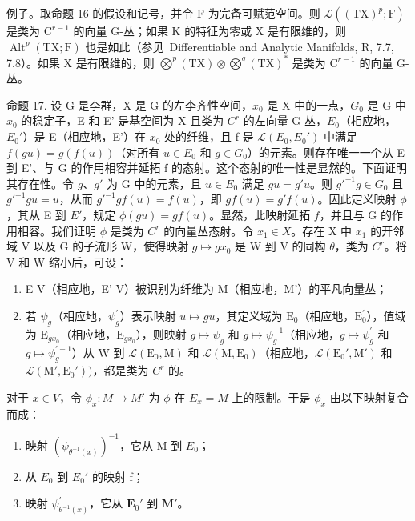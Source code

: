 例子。取命题 16 的假设和记号，并令 F 为完备可赋范空间。则 \(\mathcal{L}((\mathrm{TX})^p; \mathrm{F})\) 是类为 \(\mathrm{C}^{r-1}\) 的向量 G-丛；如果 K 的特征为零或 X 是有限维的，则 \(\operatorname{Alt}^p(\mathrm{TX}; \mathrm{F})\) 也是如此（参见~Differentiable and Analytic Manifolds, R, 7.7, 7.8）。如果 X 是有限维的，则 \(\bigotimes^p(\mathrm{TX}) \otimes \bigotimes^q(\mathrm{TX})^*\) 是类为 \(\mathrm{C}^{r-1}\) 的向量 G-丛。

命题 17. 设 G 是李群，X 是 G 的左李齐性空间，\(x_0\) 是 X 中的一点，\(G_0\) 是 G 中 \(x_0\) 的稳定子，E 和 E' 是基空间为 X 且类为 \(C^{r}\) 的左向量 G-丛，\(E_0\)（相应地，\(E_0'\)）是 E（相应地，E'）在 \(x_0\) 处的纤维，且 f 是 \(\mathcal{L}(E_0, E_0')\) 中满足 \(f(gu) = g(f(u))\)（对所有 \(u \in E_0\) 和 \(g \in G_0\)）的元素。则存在唯一一个从 E 到 E'、与 G 的作用相容并延拓 f 的态射。这个态射的唯一性是显然的。下面证明其存在性。令 \(g\)、\(g'\) 为 G 中的元素，且 \(u \in E_0\) 满足 \(gu = g'u\)。则 \(g'^{-1}g \in G_0\) 且 \(g'^{-1}gu = u\)，从而 \(g'^{-1}gf(u) = f(u)\)，即 \(gf(u) = g'f(u)\)。因此定义映射 \(\phi\)，其从 E 到 \(E'\)，规定 \(\phi(gu) = gf(u)\)。显然，此映射延拓 \(f\)，并且与 G 的作用相容。我们证明 \(\phi\) 是类为 \(C^r\) 的向量丛态射。令 \(x_1 \in X\)。存在 X 中 \(x_1\) 的开邻域 V 以及 G 的子流形 W，使得映射 \(g \mapsto gx_0\) 是 W 到 V 的同构 \(\theta\)，类为 \(C^r\)。将 V 和 W 缩小后，可设：

\begin{enumerate}
\def\labelenumi{(\arabic{enumi})}
\item
  E \textbar{} V（相应地，E' \textbar{} V）被识别为纤维为 M（相应地，M'）的平凡向量丛；
\item
  若 \(\psi_{g}\)（相应地，\(\psi_{g}^{\prime}\)）表示映射 \(u\mapsto gu\)，其定义域为 \(\mathrm{E}_0\)（相应地，\(\mathrm{E}_0^{\prime}\)），值域为 \(\mathrm{E}_{gx_0}\)（相应地，\(\mathrm{E}_{gx_0}\)），则映射 \(g\mapsto \psi_g\) 和 \(g\mapsto \psi_g^{-1}\)（相应地，\(g\mapsto \psi_g^{\prime}\) 和 \(g\mapsto \psi_g^{\prime -1}\)）从 W 到 \(\mathcal{L}(\mathrm{E}_0,\mathrm{M})\) 和 \(\mathcal{L}(\mathrm{M},\mathrm{E}_0)\)（相应地，\(\mathcal{L}(\mathrm{E}_0',\mathrm{M}')\) 和 \(\mathcal{L}(\mathrm{M}',\mathrm{E}_0'))\)，都是类为 \(C^r\) 的。
\end{enumerate}

对于 \(x \in V\)，令 \(\phi_x: M \to M'\) 为 \(\phi\) 在 \(E_x = M\) 上的限制。于是 \(\phi_x\) 由以下映射复合而成：

\begin{enumerate}
\def\labelenumi{(\arabic{enumi})}
\item
  映射 \((\psi_{\theta^{-1}(x)})^{-1}\)，它从 M 到 \(E_{0}\)；
\item
  从 \(E_{0}\) 到 \(E_{0}'\) 的映射 f；
\item
  映射 \(\psi_{\theta^{-1}(x)}^{\prime}\)，它从 \(\mathbf{E}_0'\) 到 \(\mathbf{M}'\)。
\end{enumerate}

